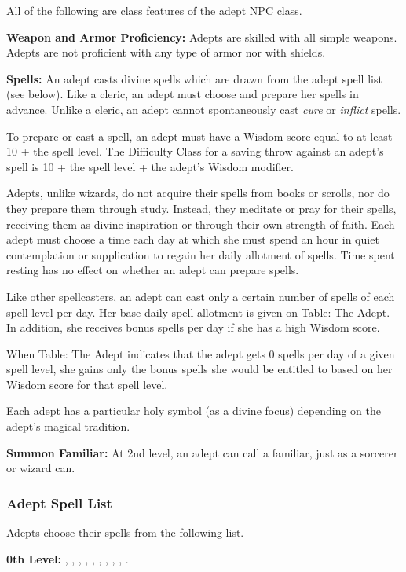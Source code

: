 All of the following are class features of the adept NPC class.

\textbf{Weapon and Armor Proficiency:} Adepts are skilled with all simple weapons. 
Adepts are not proficient with any type of armor nor with shields.

\textbf{Spells:} An adept casts divine spells which are drawn from the adept spell 
list (see below). Like a cleric, an adept must choose and prepare her spells in 
advance. Unlike a cleric, an adept cannot spontaneously cast \textit{cure} or \textit{inflict} spells.

To prepare or cast a spell, an adept must have a Wisdom score equal to at least 
10 + the spell level. The Difficulty Class for a saving throw against an adept's 
spell is 10 + the spell level + the adept's Wisdom modifier.

Adepts, unlike wizards, do not acquire their spells from books or scrolls, nor 
do they prepare them through study. Instead, they meditate or pray for their spells, 
receiving them as divine inspiration or through their own strength of faith. Each 
adept must choose a time each day at which she must spend an hour in quiet contemplation 
or supplication to regain her daily allotment of spells. Time spent resting has 
no effect on whether an adept can prepare spells.

Like other spellcasters, an adept can cast only a certain number of spells of each 
spell level per day. Her base daily spell allotment is given on Table: The Adept. 
In addition, she receives bonus spells per day if she has a high Wisdom score.

When Table: The Adept indicates that the adept gets 0 spells per day of a given 
spell level, she gains only the bonus spells she would be entitled to based on 
her Wisdom score for that spell level.

Each adept has a particular holy symbol (as a divine focus) depending on the adept's 
magical tradition.

\textbf{Summon Familiar:} At 2nd level, an adept can call a familiar, just as a 
sorcerer or wizard can.

\subsubsection{Adept Spell List}

Adepts choose their spells from the following list.

\textbf{0th Level:} , , , , , , , , , .

